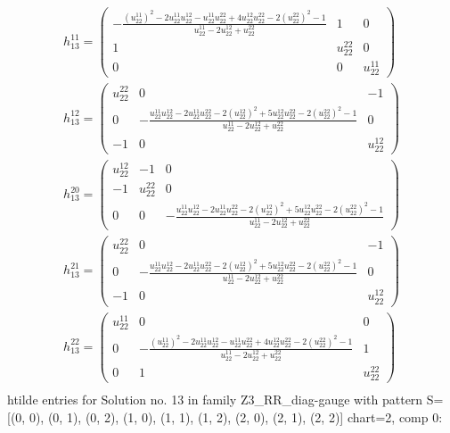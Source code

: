\documentclass[a4paper, 11pt, twoside, onecolumn]{article}
\begin{document}
\begin{landscape}
\begin{gather*}
	 h_13^{11}=\begin{pmatrix}- \frac{\left(u^{11}_{22}\right)^{2} - 2 u^{11}_{22} u^{12}_{22} - u^{11}_{22} u^{22}_{22} + 4 u^{12}_{22} u^{22}_{22} - 2 \left(u^{22}_{22}\right)^{2} - 1}{u^{11}_{22} - 2 u^{12}_{22} + u^{22}_{22}} & 1 & 0\\1 & u^{22}_{22} & 0\\0 & 0 & u^{11}_{22}\end{pmatrix}\\ 
	 h_13^{12}=\begin{pmatrix}u^{22}_{22} & 0 & -1\\0 & - \frac{u^{11}_{22} u^{12}_{22} - 2 u^{11}_{22} u^{22}_{22} - 2 \left(u^{12}_{22}\right)^{2} + 5 u^{12}_{22} u^{22}_{22} - 2 \left(u^{22}_{22}\right)^{2} - 1}{u^{11}_{22} - 2 u^{12}_{22} + u^{22}_{22}} & 0\\-1 & 0 & u^{12}_{22}\end{pmatrix}\\ 
	 h_13^{20}=\begin{pmatrix}u^{12}_{22} & -1 & 0\\-1 & u^{22}_{22} & 0\\0 & 0 & - \frac{u^{11}_{22} u^{12}_{22} - 2 u^{11}_{22} u^{22}_{22} - 2 \left(u^{12}_{22}\right)^{2} + 5 u^{12}_{22} u^{22}_{22} - 2 \left(u^{22}_{22}\right)^{2} - 1}{u^{11}_{22} - 2 u^{12}_{22} + u^{22}_{22}}\end{pmatrix}\\ 
	 h_13^{21}=\begin{pmatrix}u^{22}_{22} & 0 & -1\\0 & - \frac{u^{11}_{22} u^{12}_{22} - 2 u^{11}_{22} u^{22}_{22} - 2 \left(u^{12}_{22}\right)^{2} + 5 u^{12}_{22} u^{22}_{22} - 2 \left(u^{22}_{22}\right)^{2} - 1}{u^{11}_{22} - 2 u^{12}_{22} + u^{22}_{22}} & 0\\-1 & 0 & u^{12}_{22}\end{pmatrix}\\ 
	 h_13^{22}=\begin{pmatrix}u^{11}_{22} & 0 & 0\\0 & - \frac{\left(u^{11}_{22}\right)^{2} - 2 u^{11}_{22} u^{12}_{22} - u^{11}_{22} u^{22}_{22} + 4 u^{12}_{22} u^{22}_{22} - 2 \left(u^{22}_{22}\right)^{2} - 1}{u^{11}_{22} - 2 u^{12}_{22} + u^{22}_{22}} & 1\\0 & 1 & u^{22}_{22}\end{pmatrix}\\ 
\end{gather*} 
htilde entries for Solution no. 13 in family Z3_RR_diag-gauge with pattern S=[(0, 0), (0, 1), (0, 2), (1, 0), (1, 1), (1, 2), (2, 0), (2, 1), (2, 2)] chart=2, comp 0: 

\end{landscape}
\end{document}

